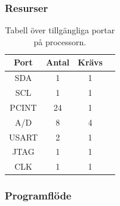 \documentclass{article}
\begin{document}
\subsubsection{Resurser}
\begin{table}[H]
  \centering
  \begin{tabular}{ | c | c | c | c |}
    \hline
    \textbf{Port} & \textbf{Antal} & \textbf{Krävs} \\
    \hline
    SDA & 1 & 1 \\
    \hline
    SCL & 1 & 1 \\
    \hline
    PCINT & 24 & 1 \\
    \hline
    A/D & 8 & 4 \\
    \hline
    USART & 2 & 1 \\
    \hline
    JTAG & 1 & 1 \\
    \hline
    CLK & 1 & 1 \\
    \hline
  \end{tabular}
  \caption{Tabell över tillgängliga portar på processorn.}
\end{table}

\subsubsection{Programflöde}
\end{document}

